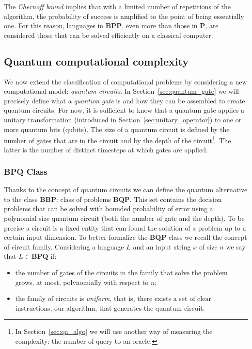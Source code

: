 The \emph{Chernoff bound} implies that with a limited number of repetitions of the algorithm, the probability of success is amplified to the point of being essentially one. For this reason, languages in \textbf{BPP}, even more than those in \textbf{P}, are considered those that can be solved efficiently on a classical computer.

\subsection{Quantum computational complexity}
We now extend the classification of computational problems by considering a new computational model: \emph{quantum circuits}. In Section~\ref{sec:quantum_gate} we will precisely define what a \emph{quantum gate} is and how they can be assembled to create quantum circuits. For now, it is sufficient to know that a quantum gate applies a unitary transformation (introduced in Section~\ref{sec:unitary_operator}) to one or more quantum bits (qubits). The size of a quantum circuit is defined by the number of gates that are in the circuit and by the depth of the circuit\footnote{In Section~\ref{sec:qa_algo} we will  use another way of measuring the complexity: the number of query to an oracle.}. The latter is the number of distinct timesteps at which gates are applied.

\subsubsection*{BPQ Class}
Thanks to the concept of quantum circuits we can define the quantum alternative to the class \textbf{BBP}: class of problems \textbf{BQP}. This set contains the decision problems that can be solved with bounded probability of error using a polynomial size quantum circuit (both the number of gate and the depth). To be precise a circuit is a fixed entity that can found the solution of a problem up to a certain input dimension. To better formalize the \textbf{BQP} class we recall the concept of circuit family. Considering  a language $L$ and an input string $x$ of size $n$ we say that $L \in \textbf{BPQ}$ if: 
\begin{itemize}
	\item the number of gates of the circuits in the family that solve the problem grows, at most, polynomially with respect to $n$;
	\item the family of circuits is \emph{uniform}, that is, there exists a set of clear instructions, our algorithm, that generates the quantum circuit.
\end{itemize}


